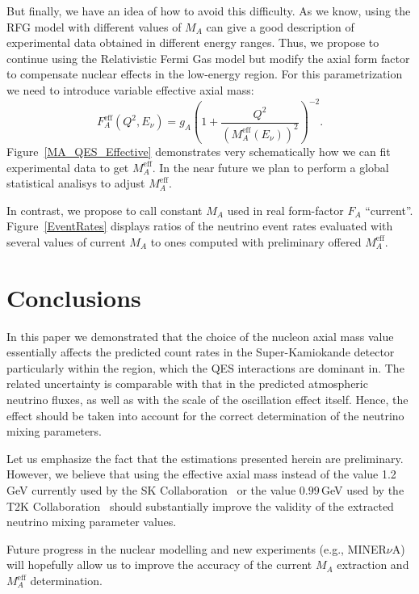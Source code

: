 \documentclass[review]{elsarticle}
\begin{document}
But finally, we have an idea of how to avoid this difficulty. As we know, using the RFG model with different values of $M_A$ can give a good description of experimental data obtained in different energy ranges. Thus, we propose to continue using the Relativistic Fermi Gas model but modify the axial form factor to compensate nuclear effects in the low-energy region. For this parametrization we need to introduce variable effective axial mass:
\begin{equation}
F_{A}^{\mathrm{eff}}(Q^{2},E_{\nu})=g_{A}\left(1+\frac{Q^{2}}{(M_{A}^{\mathrm{eff}}(E_{\nu}))^{2}}\right)^{-2}.
\end{equation}
Figure~\ref{MA_QES_Effective} demonstrates very schematically how we can fit experimental data to get $M_{A}^{\mathrm{eff}}$. In the near future we plan to perform a global statistical analisys to adjust $M_{A}^{\mathrm{eff}}$.

In contrast, we propose to call constant $M_A$ used in real form-factor $F_A$ ``current''. Figure~\ref{EventRates} displays ratios of the neutrino event rates evaluated with several values of current $M_A$ to ones computed with preliminary offered $M_{A}^{\mathrm{eff}}$.

\section{Conclusions}
In this paper we demonstrated that the choice of the nucleon axial mass value essentially affects the predicted count rates in the Super-Kamiokande detector particularly within the region, which the QES interactions are dominant in. The related uncertainty is comparable with that in the predicted atmospheric neutrino fluxes, as well as with the scale of the oscillation effect itself. Hence, the effect should be taken into account for the correct determination of the neutrino mixing parameters. 

Let us emphasize the fact that the estimations presented herein are preliminary. However, we believe that using the effective axial mass instead of the value 1.2\,GeV currently used by the SK Collaboration~\cite{Wendell:2010md} or the value $0.99$\,GeV used by the T2K Collaboration~\cite{Abe:2011ks} should substantially improve the validity of the extracted neutrino mixing parameter values.

Future progress in the nuclear modelling and new experiments (e.g., MINER$\nu$A) will hopefully allow us to improve the accuracy of the current $M_A$ extraction and $M_{A}^{\mathrm{eff}}$ determination.
\end{document}

